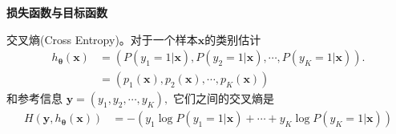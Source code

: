 \documentclass{beamer}%
\begin{document}
\begin{frame}
\vspace{-0.1cm}
{\noindent\large\textbf{损失函数与目标函数}}
\vspace{0.4cm}

交叉熵(Cross Entropy)。对于一个样本$\mathbf{x}$的类别估计
{\setlength\abovedisplayskip{0.1cm}
\setlength\belowdisplayskip{0.1cm}
\begin{equation*}
    \begin{split}
    h_{\mathbf{\theta}}(\mathbf{x}) &= (P(y_1=1|\mathbf{x}), P(y_2=1|\mathbf{x}), \cdots, P(y_K=1|\mathbf{x})).\\
                                    &= (p_1 (\mathbf{x}), p_2 (\mathbf{x}), \cdots, p_K(\mathbf{x}))
    \end{split}
\end{equation*}
}
和参考信息
    $\mathbf{y} = (y_1, y_2, \cdots, y_K),$
它们之间的交叉熵是
{\setlength\abovedisplayskip{0.1cm}
\setlength\belowdisplayskip{0.1cm}
\begin{equation}\label{equ:cross_entropy}
    \begin{split}
    H(\mathbf{y}, h_{\mathbf{\theta}}(\mathbf{x})) &= -(y_1 \log P(y_1=1|\mathbf{x}) + \cdots + y_K \log P(y_K =1|\mathbf{x}))%
    \end{split}
\end{equation}
}



\end{frame}
\end{document}
